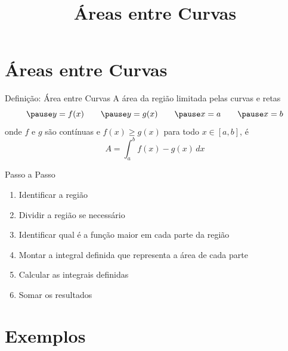 
\usepackage{integracao_e_series}

\title{Áreas entre Curvas}



\addtitle

\section{Áreas entre Curvas}


\begin{frame}{Definição: Área entre Curvas}
  A área da região limitada pelas curvas e retas
  \[
    \pause
    y = f(x)  \qquad
    \pause
    y = g(x)  \qquad
    \pause
    x = a     \qquad
    \pause
    x = b
  \]
  \pause
  onde $f$ e $g$ são contínuas e
  \pause
  $f(x) \geq g(x)$ para todo $x \in [a, b]$,
  \pause
    é
  \[
    A = \int_a^b f(x) - g(x) \, dx
  \]
\end{frame}

\begin{frame}{Passo a Passo}
  \begin{enumerate}[<+->]
    \item Identificar a região
    \item Dividir a região se necessário
    \item Identificar qual é a função maior em cada parte da região
    \item Montar a integral definida que representa a área de cada parte
    \item Calcular as integrais definidas
    \item Somar os resultados
  \end{enumerate}
\end{frame}

\section{Exemplos}

